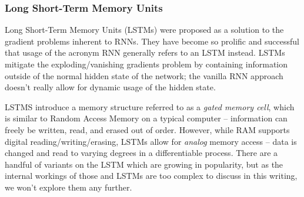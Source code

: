 \documentclass{report}
\begin{document}
\subsubsection{Long Short-Term Memory Units} \label{lstm}
Long Short-Term Memory Units (LSTMs) were proposed as a solution to the gradient problems inherent to RNNs. They have become so prolific and successful that usage of the acronym RNN generally refers to an LSTM instead. LSTMs mitigate the exploding/vanishing gradients problem by containing information outside of the normal hidden state of the network; the vanilla RNN approach doesn't really allow for dynamic usage of the hidden state. \par
LSTMS introduce a memory structure referred to as a \textit{gated memory cell}, which is similar to Random Access Memory on a typical computer -- information can freely be written, read, and erased out of order. However, while RAM supports digital reading/writing/erasing, LSTMs allow for \emph{analog} memory access -- data is changed and read to varying degrees in a differentiable process. There are a handful of variants on the LSTM which are growing in popularity, but as the internal workings of those and LSTMs are too complex to discuss in this writing, we won't explore them any further. \par
\end{document}
